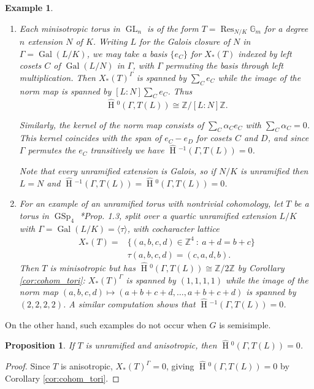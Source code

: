 \documentclass{compositio}
\theoremstyle{plain}
\newtheorem{proposition}[theorem]{Proposition}
\newtheorem{example}[theorem]{Example}
\newcommand{\HT}[1]{\hat{\HH}{}^{#1}}
\theoremstyle{definition}
\numberwithin{equation}{section}
\DeclareMathOperator{\Gal}{Gal}
\DeclareMathOperator{\HH}{H}
\DeclareMathOperator{\Res}{Res}
\DeclareMathOperator{\GL}{GL}
\DeclareMathOperator{\GSp}{GSp}
\newcommand{\ZZ}{\mathbb{Z}}
\newcommand{\Gm}{\mathbb{G}_m}
\begin{document}
\begin{example} $ $
\begin{enumerate}
\item Each minisotropic torus in $\GL_n$ is of the form $T = \Res_{N/K} \Gm$ for a degree $n$ extension $N$ of $K$.
Writing $L$ for the Galois closure of $N$ in $\Gamma=\Gal(L/K)$, we may take a basis $\{e_C\}$ for $X_*(T)$
indexed by left cosets $C$ of $\Gal(L/N)$ in $\Gamma$, with $\Gamma$ permuting the basis through left multiplication.
Then $X_*(T)^\Gamma$ is spanned by $\sum_C e_C$ while the image of the norm map is spanned by
$[L:N] \sum_C e_C$.  Thus 
\[
\HT{0}(\Gamma, T(L)) \cong \ZZ/[L:N] \ZZ.
\]

Similarly, the kernel of the norm map consists
of $\sum_C \alpha_C e_C$ with $\sum_C \alpha_C = 0$.  This kernel coincides with the span of $e_C - e_D$ for cosets
$C$ and $D$, and since $\Gamma$ permutes the $e_C$ transitively we have $\HT{-1}(\Gamma, T(L)) = 0$.

Note that every unramified extension is Galois, so if $N/K$ is unramified then $L=N$ and $\HT{-1}(\Gamma, T(L)) = \HT{0}(\Gamma, T(L)) = 0$.

\item For an example of an unramified torus with nontrivial cohomology, let $T$ be a torus in $\GSp_4$ \cite{morris:91a}*{Prop. 1.3}, split over a quartic unramified extension
$L/K$ with $\Gamma = \Gal(L/K) = \langle \tau \rangle$, with cocharacter lattice
\begin{align*}
X_*(T) = &\{(a,b,c,d) \in \ZZ^4 \: : \: a + d = b + c\} \\
& \tau(a,b,c,d) = (c,a,d,b).
\end{align*}
Then $T$ is minisotropic but has $\HT{0}(\Gamma, T(L)) \cong \ZZ/2\ZZ$ by Corollary \ref{cor:cohom_tori}:
$X_*(T)^\Gamma$ is spanned by $(1,1,1,1)$ while the image of the norm map $(a,b,c,d) \mapsto (a+b+c+d,\ldots,a+b+c+d)$
is spanned by $(2,2,2,2)$.  A similar computation shows that $\HT{-1}(\Gamma, T(L)) = 0$.
\end{enumerate}
\end{example}

On the other hand, such examples do not occur when $G$ is semisimple.

\begin{proposition}\label{prop:vanishing_H0}
If $T$ is unramified and anisotropic, then $\HT{0}(\Gamma, T(L)) = 0$.
\end{proposition}

\begin{proof}
Since $T$ is anisotropic, $X_*(T)^{\Gamma} = 0$, giving $\HT{0}(\Gamma, T(L)) = 0$ by Corollary
\ref{cor:cohom_tori}.
\end{proof}
\end{document}
